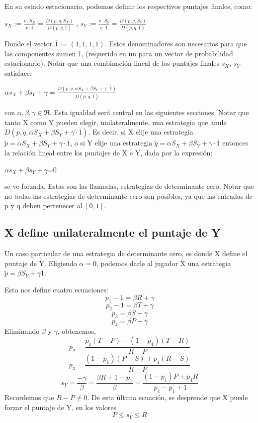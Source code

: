 \documentclass[11pt]{article}
\begin{document}
En su estado estacionario, podemos definir los respectivos puntajes finales, como:
\begin{center}
$s_X:=\frac{v \cdot S_X}{v \cdot \overline1} = \frac{D(p,q,S_X)}{D(p,q,\overline1)}$ , 
$s_Y:=\frac{v \cdot S_Y}{v \cdot \overline1} = \frac{D(p,q,S_Y)}{D(p,q,\overline1)}$
\end{center}
Donde el vector $\overline1:=(1,1,1,1)$. Estos denominadores son necesarios para que las
componentes sumen 1, (requerido en un para un vector de probabilidad estacionario).
Notar que una combinación lineal de los puntajes finales $s_X$, $s_Y$ satisface:
\begin{center}
 $\alpha s_X + \beta s_Y + \gamma=\frac{D(p,q,\alpha S_X + \beta S_Y + \gamma\cdot \overline1)}{D(p,q,\overline1)}$
\end{center}
con $\alpha, \beta, \gamma \in \Re$.\newline
Esta igualdad será central en las siguientes secciones.
Notar que tanto X como Y pueden elegir, unilateralmente, una
estrategia que anule $D(p,q,\alpha S_X + \beta S_Y + \gamma\cdot \overline1)$. Es decir, si X elije una estrategia 
$\tilde{p}= \alpha S_X + \beta S_Y + \gamma\cdot \overline1$, o si Y elije una estrategia
$\tilde{q}= \alpha S_X + \beta S_Y + \gamma\cdot \overline1$ entonces la relación lineal entre
los puntajes de X e Y, dada por la expresión:
\begin{center}
$\alpha s_X + \beta s_Y + \gamma$=0
\end{center}
se ve forzada.
Estas son las llamadas, estrategias de determinante cero.
Notar que no todas las estrategias de determinante cero son posibles, ya que las entradas de p y q deben pertenecer al $[0,1]$.

\subsection{X define unilateralmente el puntaje de Y}
Un caso particular de una estrategia de determinante cero, es donde X define el puntaje de Y.
Eligiendo $\alpha=0$, podemos darle al jugador X  una estrategia $\tilde{p}=\beta S_Y + \gamma \overline1$.

Esto nos define cuatro ecuaciones:
$$p_1-1=\beta R + \gamma$$
$$p_2-1=\beta T + \gamma$$
$$p_3=\beta S + \gamma$$
$$p_4=\beta P + \gamma$$
Eliminando $\beta$ y $\gamma$, obtenemos,
$$p_2=\frac{p_1(T-P)-(1-p_4)(T-R)}{R-P}$$
$$p_3=\frac{(1-p_1)(P-S)+p_4(R-S)}{R-P}$$
$$s_Y=\frac{-\gamma}{\beta}=\frac{\beta R+ 1-p_1}{\beta}=\frac{(1-p_1)P+p_4 R}{p_4-p_1+1}$$
Recordemos que $R-P\neq 0$.
De esta última ecuación, se desprende que X puede forzar el puntaje de Y, en los valores
$$P\leq s_Y\leq R $$
\end{document}

